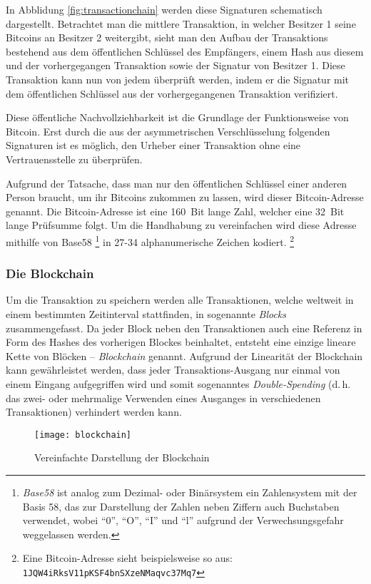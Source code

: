 In Abblidung \ref{fig:transactionchain} werden diese Signaturen schematisch dargestellt.
Betrachtet man die mittlere Transaktion, in welcher Besitzer 1 seine Bitcoins an Besitzer 2 weitergibt, sieht man den Aufbau der Transaktions bestehend aus dem öffentlichen Schlüssel des Empfängers, einem Hash aus diesem und der vorhergegangen Transaktion sowie der Signatur von Besitzer 1.
Diese Transaktion kann nun von jedem überprüft werden, indem er die Signatur mit dem öffentlichen Schlüssel aus der vorhergegangenen Transaktion verifiziert.

Diese öffentliche Nachvollziehbarkeit ist die Grundlage der Funktionsweise von Bitcoin.
Erst durch die aus der asymmetrischen Verschlüsselung folgenden Signaturen ist es möglich, den Urheber einer Transaktion ohne eine Vertrauensstelle zu überprüfen.

Aufgrund der Tatsache, dass man nur den öffentlichen Schlüssel einer anderen Person braucht, um ihr Bitcoins zukommen zu lassen, wird dieser Bitcoin-Adresse genannt.
Die Bitcoin-Adresse ist eine 160~Bit lange Zahl, welcher eine 32~Bit lange Prüfsumme folgt.
Um die Handhabung zu vereinfachen wird diese Adresse mithilfe von Base58%
\footnote{\emph{Base58} ist analog zum Dezimal- oder Binärsystem ein Zahlensystem mit der Basis 58, das zur Darstellung der Zahlen neben Ziffern auch Buchstaben verwendet, wobei "`0"', "`O"', "`I"' und "`l"' aufgrund der Verwechsungsgefahr weggelassen werden.}
in 27-34 alphanumerische Zeichen kodiert.%
\footnote{Eine Bitcoin-Adresse sieht beispielsweise so aus: \texttt{1JQW4iRksV11pKSF4bnSXzeNMaqvc37Mq7}}

\subsubsection{Die Blockchain}

Um die Transaktion zu speichern werden alle Transaktionen, welche weltweit in einem bestimmten Zeitinterval stattfinden, in sogenannte \emph{Blocks} zusammengefasst.
Da jeder Block neben den Transaktionen auch eine Referenz in Form des Hashes des vorherigen Blockes beinhaltet, entsteht eine einzige lineare Kette von Blöcken -- \emph{Blockchain} genannt.
Aufgrund der Linearität der Blockchain kann gewährleistet werden, dass jeder Transaktions-Ausgang nur einmal von einem Eingang aufgegriffen wird und somit sogenanntes \emph{Double-Spending} (d.\,h. das zwei- oder mehrmalige Verwenden eines Ausganges in verschiedenen Transaktionen) verhindert werden kann.

\begin{figure}[htb]
    \begin{center}
        \texttt{[image: blockchain]}
        \caption{Vereinfachte Darstellung der Blockchain \parencite[3]{nakamoto}}
        \label{fig:blockchain}
    \end{center}
\end{figure}

